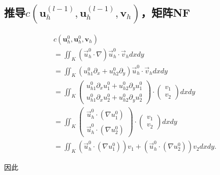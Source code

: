 \documentclass{ctexart}
\begin{document}
\subsection{推导$c(\mathbf{u}_h^{(l-1)}, \mathbf{u}_h^{(l-1)}, \mathbf{v}_h)$，矩阵NF}
\begin{align*}
    & c(\mathbf{u}_h^{0}, \mathbf{u}_h^0, \mathbf{v}_h)\\ 
    & = \iint_K(\vec{u} _h^0 \cdot \nabla) \vec{u}_h^0\cdot \vec{v}_hdxdy\\ 
    & = \iint_K(u_{h1}^0 \partial_x + u_{h2}^0 \partial_y) \vec{u}_h^0 \cdot \vec{v}_h dxdy\\
    & = \iint_K \begin{pmatrix}
     u_{h1}^0\partial _xu_1^0 + u_{h2}^0\partial _yu_1^0 \\
     u_{h1}^0\partial _xu_2^0 + u_{h2}^0\partial _yu_2^0
    \end{pmatrix}
    \cdot \begin{pmatrix}
     v_1\\
    v_2
    \end{pmatrix}dxdy\\
    & = \iint_K \begin{pmatrix}
     \vec{u}_h^0 \cdot (\nabla u_1^0) \\
     \vec{u}_h^0 \cdot (\nabla u_2^0)
    \end{pmatrix}
    \cdot \begin{pmatrix}
     v_1\\
    v_2
    \end{pmatrix}dxdy\\
    & = \iint_K (\vec{u}_h^0 \cdot (\nabla u_1^0)) v_1 + (\vec{u}_h^0 \cdot (\nabla u_2^0)) v_2dxdy.
\end{align*}

因此
\end{document}
